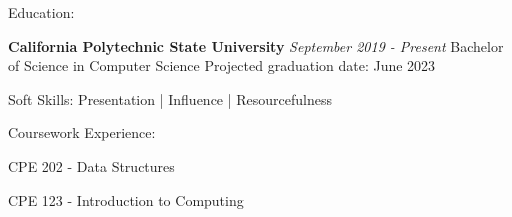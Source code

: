 \documentclass{resume3}%
\begin{document}
%
\normalsize%
\begin{flushleft}%
\newcommand{\EducationEntry}[1]{
                            {\bf\italic California Polytechnic State University\linebreak }
                            {\em September {#1} - Present}
                        }%
\newcommand{\BoldHeading}[1]{
                            {\bf{#1}}
                        }%
\newcommand{\DatedEntry}[2]{
                            \bf\item\fbox{#1} 
                            ->
                            {\bf\em{#2}}
                        }%
\newcommand{\FirstDatedEntry}[2]{
                            \bf\text\fbox{#1} 
                            ->
                            {\bf\em{#2}}
                        }%
\begin{rSection}{Education:}%
\EducationEntry{2019}%
\linebreak%
Bachelor of Science in Computer Science%
\linebreak%
Projected graduation date: June 2023%
\end{rSection}%
\begin{rSection}{Soft Skills:}%
Presentation |  Influence |  Resourcefulness%
\end{rSection}%
\begin{rSection}{Coursework Experience:}%
%
\item{CPE 202 {-} Data Structures}%
\item{CPE 123 {-} Introduction to Computing}%
\end{rSection}%
\end{flushleft}%
\end{document}

